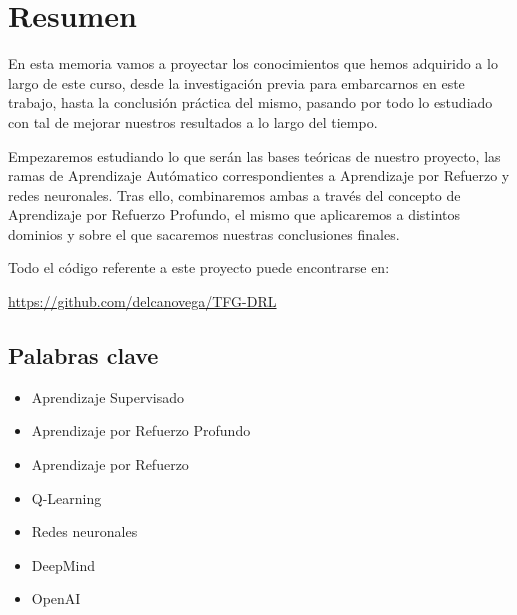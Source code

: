 \chapter*{Resumen}

En esta memoria vamos a proyectar los conocimientos que hemos adquirido a lo largo de este curso, desde la investigación previa para embarcarnos en este trabajo, hasta la conclusión práctica del mismo, pasando por todo lo estudiado con tal de mejorar nuestros resultados a lo largo del tiempo.

Empezaremos estudiando lo que serán las bases teóricas de nuestro proyecto, las ramas de Aprendizaje Autómatico correspondientes a Aprendizaje por Refuerzo y redes neuronales. Tras ello, combinaremos ambas a través del concepto de Aprendizaje por Refuerzo Profundo, el mismo que aplicaremos a distintos dominios y sobre el que sacaremos nuestras conclusiones finales.

Todo el código referente a este proyecto puede encontrarse en:

\url{https://github.com/delcanovega/TFG-DRL}

\section*{Palabras clave}
   
\begin{itemize}
    \item Aprendizaje Supervisado
    \item Aprendizaje por Refuerzo Profundo
    \item Aprendizaje por Refuerzo
    \item Q-Learning
    \item Redes neuronales
    \item DeepMind 
    \item OpenAI
\end{itemize}